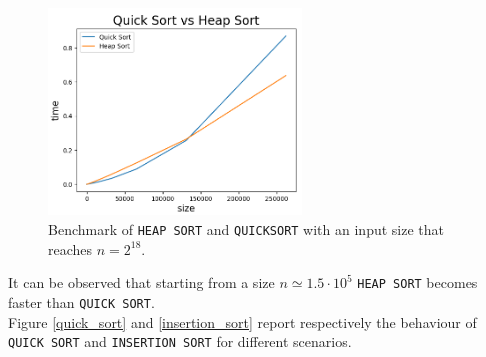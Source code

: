 \documentclass{article}
\begin{document}
	\begin{figure}[h]
		\centering
		\includegraphics[width=0.6\textwidth]{../plots/quick_heap_sort_plot.png}  
		\caption{Benchmark of \texttt{HEAP SORT} and \texttt{QUICKSORT} with an input size that reaches $n=2^{18}$.}
		\label{heap_quick}
	\end{figure}
	\noindent It can be observed that starting from a size $n\simeq 1.5 \cdot 10^5$ \texttt{HEAP SORT} becomes faster than \texttt{QUICK SORT}.\\
	Figure \ref{quick_sort} and \ref{insertion_sort} report respectively the behaviour of \texttt{QUICK SORT} and \texttt{INSERTION SORT} for different scenarios.
	
\end{document}
